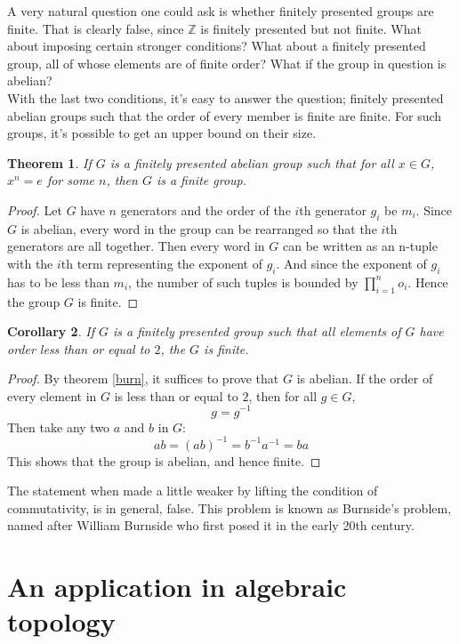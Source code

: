 \documentclass[12pt, titlepage]{article}
\newtheorem{thm}{Theorem}[section]
\newtheorem{cor}[thm]{Corollary}
\theoremstyle{definition}
\begin{document}
A very natural question one could ask is whether finitely presented groups are finite. That is clearly false, since $\mathbb{Z}$ is finitely presented but not finite. What about imposing certain stronger conditions? What about a finitely presented group, all of whose elements are of finite order? What if the group in question is abelian?\cite{baumslag}\\
With the last two conditions, it's easy to answer the question; finitely presented abelian groups such that the order of every member is finite are finite. For such groups, it's possible to get an upper bound on their size.

\begin{thm}\label{burn}
If $G$ is a finitely presented abelian group such that for all $x \in G$, $x^n=e$ for some $n$, then $G$ is a finite group.
\end{thm}

\begin{proof}
Let $G$ have $n$ generators and the order of the $i$th generator $g_i$ be $m_i$. Since $G$ is abelian, every word in the group can be rearranged so that the $i$th generators are all together. Then every word in $G$ can be written as an n-tuple with the $i$th term representing the exponent of $g_i$. And since the exponent of $g_i$ has to be less than $m_i$, the number of such tuples is bounded by $\prod_{i=1}^{n}o_i$. Hence the group $G$ is finite.
\end{proof}

\begin{cor}
If $G$ is a finitely presented group such that all elements of $G$ have order less than or equal to $2$, the $G$ is finite.
\end{cor}

\begin{proof}
By theorem \autoref{burn}, it suffices to prove that $G$ is abelian. If the order of every element in $G$ is less than or equal to $2$, then for all $g \in G$,
$$g=g^{-1}$$
Then take any two $a$ and $b$ in $G$:
$$ab = (ab)^{-1} = b^{-1}a^{-1} = ba$$
This shows that the group is abelian, and hence finite.
\end{proof}

The statement when made a little weaker by lifting the condition of commutativity, is in general, false. This problem is known as Burnside's problem, named after William Burnside who first posed it in the early 20th century.

\section{An application in algebraic topology}
\end{document}
